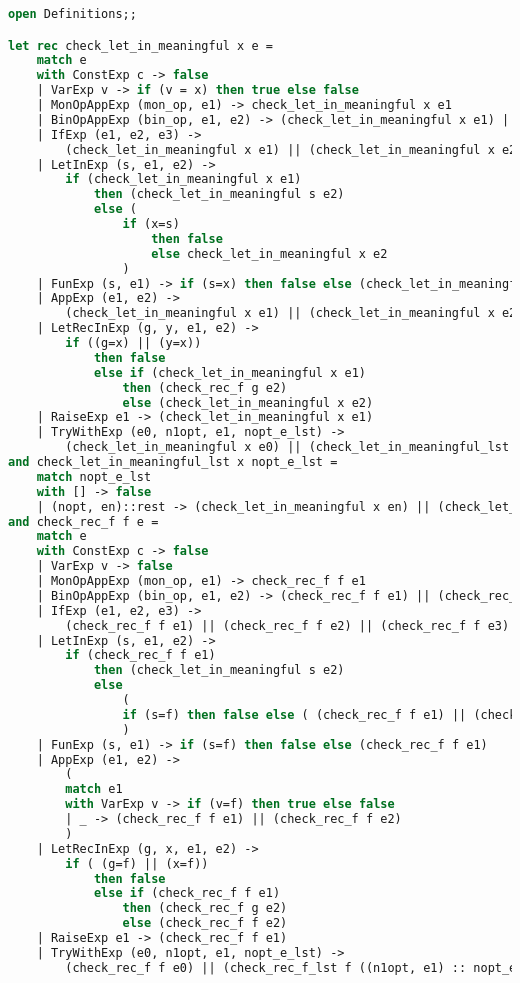 \begin{lstlisting}[language=Caml, caption=Tail recursion for PicoML expressions]
open Definitions;;

let rec check_let_in_meaningful x e =
    match e
    with ConstExp c -> false
    | VarExp v -> if (v = x) then true else false
    | MonOpAppExp (mon_op, e1) -> check_let_in_meaningful x e1
    | BinOpAppExp (bin_op, e1, e2) -> (check_let_in_meaningful x e1) || (check_let_in_meaningful x e2) 
    | IfExp (e1, e2, e3) ->
        (check_let_in_meaningful x e1) || (check_let_in_meaningful x e2)  || (check_let_in_meaningful x e3) 
    | LetInExp (s, e1, e2) ->
        if (check_let_in_meaningful x e1)
            then (check_let_in_meaningful s e2)
            else (
                if (x=s) 
                    then false
                    else check_let_in_meaningful x e2
                )
    | FunExp (s, e1) -> if (s=x) then false else (check_let_in_meaningful x e1)
    | AppExp (e1, e2) -> 
        (check_let_in_meaningful x e1) || (check_let_in_meaningful x e2)
    | LetRecInExp (g, y, e1, e2) ->
        if ((g=x) || (y=x)) 
            then false 
            else if (check_let_in_meaningful x e1) 
                then (check_rec_f g e2)
                else (check_let_in_meaningful x e2)
    | RaiseExp e1 -> (check_let_in_meaningful x e1)
    | TryWithExp (e0, n1opt, e1, nopt_e_lst) ->
        (check_let_in_meaningful x e0) || (check_let_in_meaningful_lst x ((n1opt,e1)::nopt_e_lst) )
and check_let_in_meaningful_lst x nopt_e_lst = 
    match nopt_e_lst 
    with [] -> false
    | (nopt, en)::rest -> (check_let_in_meaningful x en) || (check_let_in_meaningful_lst x rest)
and check_rec_f f e =
    match e 
    with ConstExp c -> false
    | VarExp v -> false
    | MonOpAppExp (mon_op, e1) -> check_rec_f f e1
    | BinOpAppExp (bin_op, e1, e2) -> (check_rec_f f e1) || (check_rec_f f e2)
    | IfExp (e1, e2, e3) ->
        (check_rec_f f e1) || (check_rec_f f e2) || (check_rec_f f e3)
    | LetInExp (s, e1, e2) ->
        if (check_rec_f f e1) 
            then (check_let_in_meaningful s e2)
            else
                (
                if (s=f) then false else ( (check_rec_f f e1) || (check_rec_f f e2) )
                )
    | FunExp (s, e1) -> if (s=f) then false else (check_rec_f f e1)
    | AppExp (e1, e2) -> 
        (
        match e1
        with VarExp v -> if (v=f) then true else false
        | _ -> (check_rec_f f e1) || (check_rec_f f e2)
        )
    | LetRecInExp (g, x, e1, e2) -> 
        if ( (g=f) || (x=f)) 
            then false 
            else if (check_rec_f f e1) 
                then (check_rec_f g e2)
                else (check_rec_f f e2)
    | RaiseExp e1 -> (check_rec_f f e1)
    | TryWithExp (e0, n1opt, e1, nopt_e_lst) ->
        (check_rec_f f e0) || (check_rec_f_lst f ((n1opt, e1) :: nopt_e_lst) )


\end{lstlisting}
